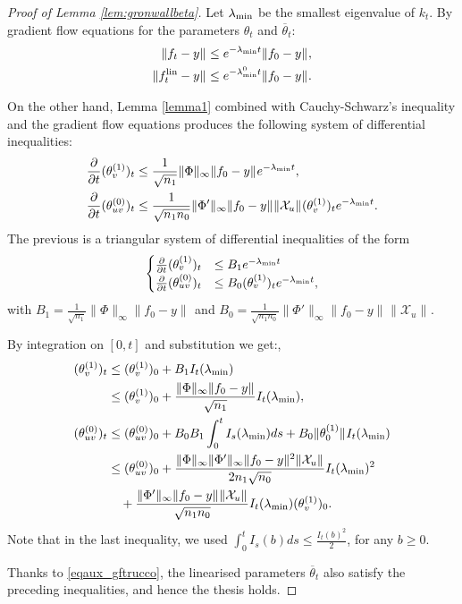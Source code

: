 \documentclass{article}
\theoremstyle{definition}
\theoremstyle{remark}
\numberwithin{equation}{section}
\newcommand{\X}{\mathcal{X}}
\newcommand{\lin}{{\textup{lin}}}
\newcommand{\lammin}{\lambda_{\textup{min}}}
\newcommand{\norm}[2]{
    \|#1\|_{#2}
}
\begin{document}
    \begin{proof}[Proof of Lemma \ref{lem:gronwallbeta}]
        Let $\lammin$ be the smallest eigenvalue of $k_t$.
        By gradient flow equations for the parameters $\theta_t$ and $\overline \theta_t$: 
        \begin{align}
            \label{eqaux_gftrucco}
            \norm{f_t-y}{} &\le e^{-\lammin t} \norm{f_0 - y}{}, \\
            \norm{f_t^\lin-y}{} &\le e^{-\lammin^0 t} \norm{f_0 - y}{}.
        \end{align}
        
        On the other hand,
        Lemma \ref{lemma1} combined with Cauchy-Schwarz's inequality and the gradient flow equations produces the following system of differential inequalities:
    \begin{align}
        \label{eqaux_gfineq}
        \frac{\partial}{\partial t} {(\theta_v^{(1)})_t} &\le \frac{1}{\sqrt{n_1}}\norm{\Phi}{\infty}\norm{f_0-y}{} e^{-\lammin t},\\
        \frac{\partial}{\partial t} {(\theta_{uv}^{(0)})_t} &\le \frac{1}{\sqrt{n_1n_0}}\norm{\Phi'}{\infty}\norm{f_0-y}{}\norm{\X_u}{}(\theta^{(1)}_v)_t e^{-\lammin t}.
    \end{align}
    The previous is a triangular system of differential inequalities of the form
    \[\begin{cases}
        \frac{\partial}{\partial t} {(\theta_v^{(1)})_t} &\le B_1  e^{-\lammin t} \\
        \frac{\partial}{\partial t} {(\theta_{uv}^{(0)})_t} &\le B_0 (\theta^{(1)}_v)_t  e^{-\lammin t},
    \end{cases}\] 
    with $B_1=\frac{1}{\sqrt{n_1}}\norm{\Phi}{\infty}\norm{f_0-y}{}$ and $B_0=\frac{1}{\sqrt{n_1n_0}}\norm{\Phi'}{\infty}\norm{f_0-y}{}\norm{\X_u}{}$.
    
    By integration on $[0,t]$ and substitution we get:,
    \begin{align}
        \label{eqaux_gronwalls}
        (\theta_v^{(1)})_t &\le (\theta_v^{(1)})_0 + B_1I_t(\lammin)\\
        &\le(\theta_v^{(1)})_0 + \frac{\norm{\Phi}{\infty}\norm{f_0-y}{}}{\sqrt{n_1}}I_t(\lammin),\\
        (\theta_{uv}^{(0)})_t &\le (\theta_{uv}^{(0)})_0 + B_0B_1\int_0^tI_s(\lammin)ds + B_0\norm{\theta^{(1)}_0}{}I_t(\lammin)\\
        &\le (\theta_{uv}^{(0)})_0 + \frac{\norm{\Phi}{\infty}\norm{\Phi'}{\infty}\norm{f_0-y}{}^2\norm{\X_u}{}}{2n_1\sqrt{n_0}}I_t(\lammin)^2 \\
        &\quad + \frac{\norm{\Phi'}{\infty}\norm{f_0-y}{}\norm{\X_u}{}}{\sqrt{n_1n_0}}I_t(\lammin)(\theta^{(1)}_v)_0.
    \end{align}
    Note that in the last inequality, we used $\int_0^t I_s(b)ds \le \frac{I_t(b)^2}{2}$, for any $b\ge 0$.
    
    Thanks to \eqref{eqaux_gftrucco}, the linearised parameters $\overline \theta_t$ also satisfy the preceding inequalities, and hence the thesis holds.
    \end{proof}
\end{document}
